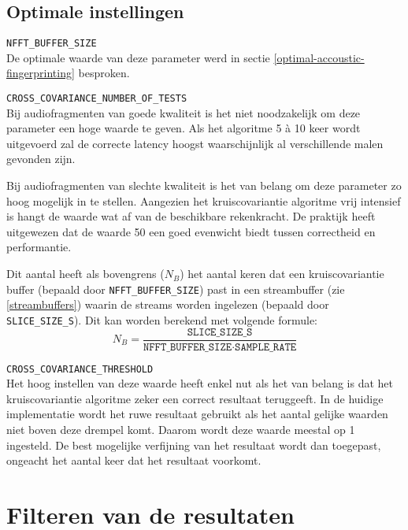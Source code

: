 \subsection{Optimale instellingen}
\begin{description}	
	\item\texttt{NFFT\_BUFFER\_SIZE} \hfill \\
	De optimale waarde van deze parameter werd in sectie \ref{optimal-accoustic-fingerprinting} besproken.
	
	\item\texttt{CROSS\_COVARIANCE\_NUMBER\_OF\_TESTS} \hfill \\
	Bij audiofragmenten van goede kwaliteit is het niet noodzakelijk om deze parameter een hoge waarde te geven. Als het algoritme 5 à 10 keer wordt uitgevoerd zal de correcte latency hoogst waarschijnlijk al verschillende malen gevonden zijn. 
	
	Bij audiofragmenten van slechte kwaliteit is het van belang om deze parameter zo hoog mogelijk in te stellen. Aangezien het kruiscovariantie algoritme vrij intensief is hangt de waarde wat af van de beschikbare rekenkracht. De praktijk heeft uitgewezen dat de waarde 50 een goed evenwicht biedt tussen correctheid en performantie.
	
	Dit aantal heeft als bovengrens ($ N_B $) het aantal keren dat een kruiscovariantie buffer (bepaald door \texttt{NFFT\_BUFFER\_SIZE}) past in een streambuffer (zie \ref{streambuffers}) waarin de streams worden ingelezen (bepaald door \texttt{SLICE\_SIZE\_S}). Dit kan worden berekend met volgende formule:
	\begin{equation}
		N_B = \frac{\texttt{SLICE\_SIZE\_S}}{\texttt{NFFT\_BUFFER\_SIZE} \cdot \texttt{SAMPLE\_RATE}}
	\end{equation}
	
	\item\texttt{CROSS\_COVARIANCE\_THRESHOLD} \hfill \\
	Het hoog instellen van deze waarde heeft enkel nut als het van belang is dat het kruiscovariantie algoritme zeker een correct resultaat teruggeeft. In de huidige implementatie wordt het ruwe resultaat gebruikt als het aantal gelijke waarden niet boven deze drempel komt. Daarom wordt deze waarde meestal op 1 ingesteld. De best mogelijke verfijning van het resultaat wordt dan toegepast, ongeacht het aantal keer dat het resultaat voorkomt. 
\end{description}

\section{Filteren van de resultaten}
\label{filtering}

